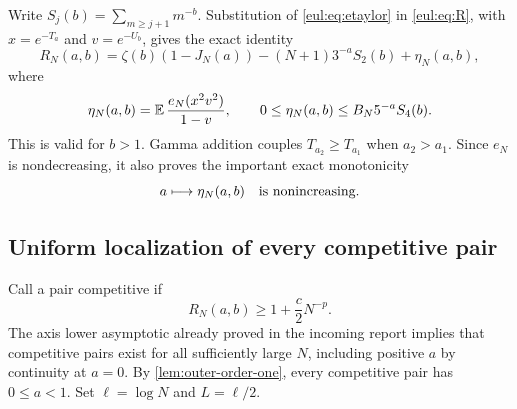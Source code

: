 Write $S_j(b)=\sum_{m\geq j+1}m^{-b}$.  Substitution of
\eqref{eul:eq:etaylor} in \eqref{eul:eq:R}, with $x=e^{-T_a}$ and
$v=e^{-U_b}$, gives the exact identity
\begin{equation}\label{eul:eq:exactexpansion}
 R_N(a,b)=\zeta(b)(1-J_N(a))
 -(N+1)3^{-a}S_2(b)+\eta_N(a,b),
\end{equation}
where
\begin{equation}\label{eul:eq:eta}
 \eta_N(a,b)=\operatorname{\mathbb E}\frac{e_N(x^2v^2)}{1-v},\qquad
 0\leq\eta_N(a,b)\leq B_N5^{-a}S_4(b).
\end{equation}
This is valid for $b>1$.  Gamma addition couples $T_{a_2}\geq T_{a_1}$
when $a_2>a_1$.  Since $e_N$ is nondecreasing, it also proves the
important exact monotonicity
\begin{equation}\label{eul:eq:etamonotone}
 a\longmapsto\eta_N(a,b)\quad\hbox{is nonincreasing}.
\end{equation}

\subsection{Uniform localization of every competitive pair}
Call a pair competitive if
\begin{equation}\label{eul:eq:competitive}
 R_N(a,b)\geq1+\frac c2N^{-p}.
\end{equation}
The axis lower asymptotic already proved in the incoming report implies
that competitive pairs exist for all sufficiently large $N$, including
positive $a$ by continuity at $a=0$.
By \cref{lem:outer-order-one}, every competitive pair has $0\leq a<1$.
Set $\ell=\log N$ and $L=\ell/2$.

